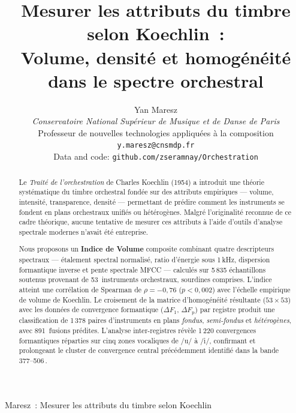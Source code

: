 \documentclass[journal]{IEEEtran}
\newcommand{\Fp}{F_\mathrm{p}}
\newcommand{\Hz}{\,\text{Hz}}
\begin{document}
\title{Mesurer les attributs du timbre selon Koechlin~:\\Volume, densité et homogénéité\\dans le spectre orchestral}

\author{%
  Yan Maresz\\
  \textit{Conservatoire National Supérieur de Musique et de Danse de Paris}\\
  Professeur de nouvelles technologies appliquées à la composition\\
  \texttt{y.maresz@cnsmdp.fr}\\
  Data and code: \texttt{github.com/zseramnay/Orchestration}%
  }

%
{Maresz~: Mesurer les attributs du timbre selon Koechlin}

\maketitle

\begin{abstract}
Le \textit{Traité de l'orchestration} de Charles Koechlin (1954) a introduit une théorie systématique du timbre orchestral fondée sur des attributs empiriques --- volume, intensité, transparence, densité --- permettant de prédire comment les instruments se fondent en plans orchestraux unifiés ou hétérogènes. Malgré l'originalité reconnue de ce cadre théorique, aucune tentative de mesurer ces attributs à l'aide d'outils d'analyse spectrale modernes n'avait été entreprise.

Nous proposons un \textbf{Indice de Volume} composite combinant quatre descripteurs spectraux --- étalement spectral normalisé, ratio d'énergie sous 1\,kHz, dispersion formantique inverse et pente spectrale MFCC --- calculés sur 5\,835 échantillons soutenus provenant de 53~instruments orchestraux, sourdines comprises. L'indice atteint une corrélation de Spearman de $\rho = -0{,}76$ ($p < 0{,}002$) avec l'échelle empirique de volume de Koechlin. Le croisement de la matrice d'homogénéité résultante ($53 \times 53$) avec les données de convergence formantique ($\Delta F_1$, $\Delta\Fp$) par registre produit une classification de 1\,378 paires d'instruments en plans \textit{fondus}, \textit{semi-fondus} et \textit{hétérogènes}, avec 891~fusions prédites. L'analyse inter-registres révèle 1\,220 convergences formantiques réparties sur cinq zones vocaliques de /u/ à /i/, confirmant et prolongeant le cluster de convergence central précédemment identifié dans la bande 377--506\Hz.
\end{abstract}
\end{document}
